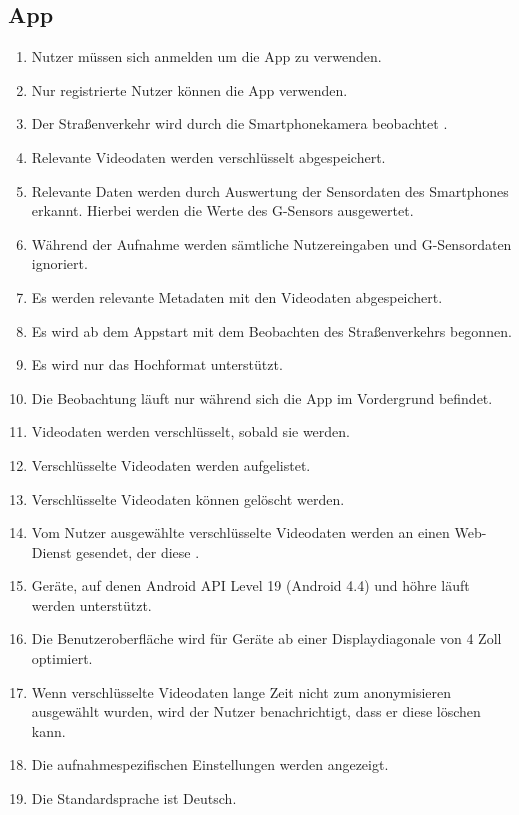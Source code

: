 \subsection{App}
	\begin{enumerate}
	\renewcommand{\labelenumi}{\textbf{\theenumi}}
	\renewcommand{\theenumi}{PK\arabic{enumi}0}
	\setcounter{enumi}{99}
	\item Nutzer müssen sich anmelden um die \gls{App} zu verwenden.
	\item Nur registrierte Nutzer können die \gls{App} verwenden.
	\item Der Straßenverkehr wird durch die \gls{Smartphone}kamera beobachtet .
	\item Relevante Videodaten werden verschlüsselt abgespeichert.
	\item Relevante Daten werden durch Auswertung der Sensordaten des \glspl{Smartphone} erkannt. Hierbei werden die Werte des G-Sensors ausgewertet.
	\item Während der Aufnahme werden sämtliche Nutzereingaben und \gls{G-Sensor}daten ignoriert.
	\item Es werden relevante \gls{Metadaten} mit den Videodaten abgespeichert.
	\item Es wird ab dem \gls{App}start mit dem Beobachten des Straßenverkehrs begonnen.
	\item Es wird nur das Hochformat unterstützt.
	\item Die Beobachtung läuft nur während sich die \gls{App} im Vordergrund befindet.
	\item Videodaten werden verschlüsselt, sobald sie  werden.
	\item Verschlüsselte Videodaten werden aufgelistet.
	\item Verschlüsselte Videodaten können gelöscht werden.
	\item Vom Nutzer ausgewählte verschlüsselte Videodaten werden an einen \gls{Web-Dienst} gesendet, der diese .
	\item Geräte, auf denen \gls{Android} \gls{API} Level 19 (Android 4.4) und höhre läuft werden unterstützt.
	\item Die Benutzeroberfläche wird für Geräte ab einer Displaydiagonale von 4 Zoll optimiert.
	\item Wenn verschlüsselte Videodaten lange Zeit nicht zum \gls{anonymisieren} ausgewählt wurden, wird der Nutzer benachrichtigt, dass er diese löschen kann.
	\item Die aufnahmespezifischen Einstellungen werden angezeigt.
	\item Die Standardsprache ist Deutsch.
	\end{enumerate}

